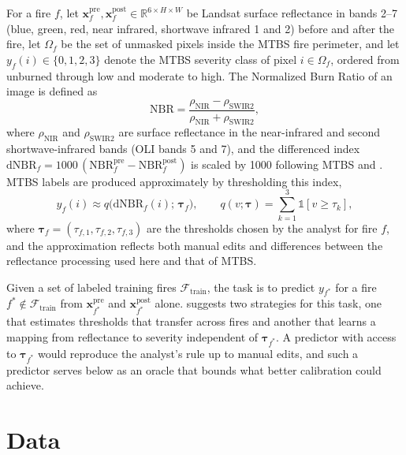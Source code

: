 \documentclass[10pt]{article}
\begin{document}
For a fire $f$, let $\mathbf{x}^{\text{pre}}_f, \mathbf{x}^{\text{post}}_f \in \mathbb{R}^{6 \times H \times W}$ be Landsat surface reflectance in bands 2--7 (blue, green, red, near infrared, shortwave infrared 1 and 2) before and after the fire, let $\Omega_f$ be the set of unmasked pixels inside the MTBS fire perimeter, and let $y_f(i) \in \{0, 1, 2, 3\}$ denote the MTBS severity class of pixel $i \in \Omega_f$, ordered from unburned through low and moderate to high.
The Normalized Burn Ratio of an image is defined as
\begin{equation}
  \mathrm{NBR} = \frac{\rho_{\text{NIR}} - \rho_{\text{SWIR2}}}{\rho_{\text{NIR}} + \rho_{\text{SWIR2}}},
\end{equation}
where $\rho_{\text{NIR}}$ and $\rho_{\text{SWIR2}}$ are surface reflectance in the near-infrared and second shortwave-infrared bands (OLI bands 5 and 7), and the differenced index $\mathrm{dNBR}_f = 1000\,(\mathrm{NBR}^{\text{pre}}_f - \mathrm{NBR}^{\text{post}}_f)$ is scaled by 1000 following MTBS and \citet{key2006landscape}.
MTBS labels are produced approximately by thresholding this index,
\begin{equation}
  y_f(i) \approx q\big(\mathrm{dNBR}_f(i);\, \boldsymbol{\tau}_f\big), \qquad q(v; \boldsymbol{\tau}) = \sum_{k=1}^{3} \mathbb{1}[v \geq \tau_k],
  \label{eq:mtbs}
\end{equation}
where $\boldsymbol{\tau}_f = (\tau_{f,1}, \tau_{f,2}, \tau_{f,3})$ are the thresholds chosen by the analyst for fire $f$, and the approximation reflects both manual edits and differences between the reflectance processing used here and that of MTBS.

Given a set of labeled training fires $\mathcal{F}_{\text{train}}$, the task is to predict $y_{f^*}$ for a fire $f^* \notin \mathcal{F}_{\text{train}}$ from $\mathbf{x}^{\text{pre}}_{f^*}$ and $\mathbf{x}^{\text{post}}_{f^*}$ alone.
 suggests two strategies for this task, one that estimates thresholds that transfer across fires and another that learns a mapping from reflectance to severity independent of $\boldsymbol{\tau}_{f^*}$.
A predictor with access to $\boldsymbol{\tau}_{f^*}$ would reproduce the analyst's rule up to manual edits, and such a predictor serves below as an oracle that bounds what better calibration could achieve.

\section{Data}
\label{sec:data}
\end{document}
